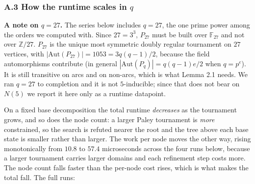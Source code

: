 \documentclass[
]{article}
\begin{document}
\subsubsection{\texorpdfstring{A.3 How the runtime scales in
\(q\)}{A.3 How the runtime scales in q}}\label{a.3-how-the-runtime-scales-in-q}

\textbf{A note on \(q = 27\).} The series below includes \(q = 27\), the
one prime power among the orders we computed with. Since \(27 = 3^3\),
\(P_{27}\) must be built over \(\mathbb{F}_{27}\) and not over
\(\mathbb{Z}/27\). \(P_{27}\) is the unique most symmetric doubly
regular tournament on \(27\) vertices, with
\(|\mathrm{Aut}(P_{27})| = 1053 = 3q(q-1)/2\), because the field
automorphisms contribute (in general \(|\mathrm{Aut}(P_q)| = q(q-1)e/2\)
when \(q = p^e\)). It is still transitive on arcs and on non-arcs, which
is what Lemma 2.1 needs. We ran \(q = 27\) to completion and it is not
\(5\)-inducible; since that does not bear on \(N(5)\) we report it here
only as a runtime datapoint.

On a fixed base decomposition the total runtime \emph{decreases} as the
tournament grows, and so does the node count: a larger Paley tournament
is \emph{more} constrained, so the search is refuted nearer the root and
the tree above each base state is smaller rather than larger. The work
per node moves the other way, rising monotonically from \(10.8\) to
\(57.4\) microseconds across the four runs below, because a larger
tournament carries larger domains and each refinement step costs more.
The node count falls faster than the per-node cost rises, which is what
makes the total fall. The full runs:
\end{document}
